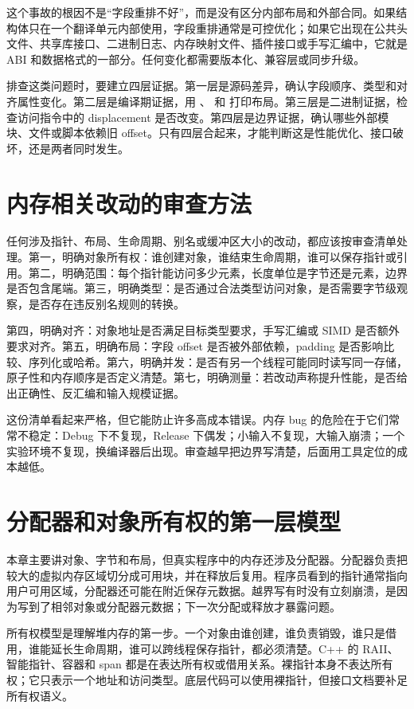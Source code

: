 这个事故的根因不是“字段重排不好”，而是没有区分内部布局和外部合同。如果结构体只在一个翻译单元内部使用，字段重排通常是可控优化；如果它出现在公共头文件、共享库接口、二进制日志、内存映射文件、插件接口或手写汇编中，它就是 ABI 和数据格式的一部分。任何变化都需要版本化、兼容层或同步升级。

排查这类问题时，要建立四层证据。第一层是源码差异，确认字段顺序、类型和对齐属性变化。第二层是编译期证据，用 、 和  打印布局。第三层是二进制证据，检查访问指令中的 displacement 是否改变。第四层是边界证据，确认哪些外部模块、文件或脚本依赖旧 offset。只有四层合起来，才能判断这是性能优化、接口破坏，还是两者同时发生。

\section{内存相关改动的审查方法}

任何涉及指针、布局、生命周期、别名或缓冲区大小的改动，都应该按审查清单处理。第一，明确对象所有权：谁创建对象，谁结束生命周期，谁可以保存指针或引用。第二，明确范围：每个指针能访问多少元素，长度单位是字节还是元素，边界是否包含尾端。第三，明确类型：是否通过合法类型访问对象，是否需要字节级观察，是否存在违反别名规则的转换。

第四，明确对齐：对象地址是否满足目标类型要求，手写汇编或 SIMD 是否额外要求对齐。第五，明确布局：字段 offset 是否被外部依赖，padding 是否影响比较、序列化或哈希。第六，明确并发：是否有另一个线程可能同时读写同一存储，原子性和内存顺序是否定义清楚。第七，明确测量：若改动声称提升性能，是否给出正确性、反汇编和输入规模证据。

这份清单看起来严格，但它能防止许多高成本错误。内存 bug 的危险在于它们常常不稳定：Debug 下不复现，Release 下偶发；小输入不复现，大输入崩溃；一个实验环境不复现，换编译器后出现。审查越早把边界写清楚，后面用工具定位的成本越低。

\section{分配器和对象所有权的第一层模型}

本章主要讲对象、字节和布局，但真实程序中的内存还涉及分配器。分配器负责把较大的虚拟内存区域切分成可用块，并在释放后复用。程序员看到的指针通常指向用户可用区域，分配器还可能在附近保存元数据。越界写有时没有立刻崩溃，是因为写到了相邻对象或分配器元数据；下一次分配或释放才暴露问题。

所有权模型是理解堆内存的第一步。一个对象由谁创建，谁负责销毁，谁只是借用，谁能延长生命周期，谁可以跨线程保存指针，都必须清楚。C++ 的 RAII、智能指针、容器和 span 都是在表达所有权或借用关系。裸指针本身不表达所有权；它只表示一个地址和访问类型。底层代码可以使用裸指针，但接口文档要补足所有权语义。

